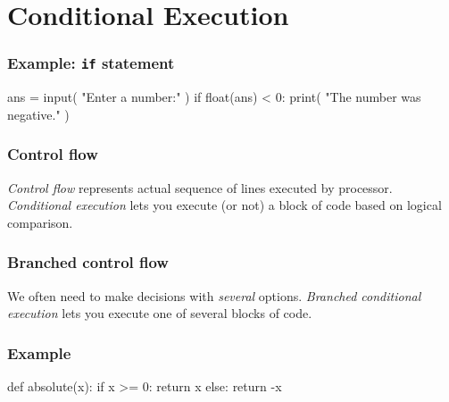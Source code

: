 \documentclass[11pt]{beamer}
\begin{document}
\section{Conditional Execution}

\begin{frame}[fragile]
  \frametitle{Example:  \texttt{if} statement}
  \Enlarge

  \begin{semiverbatim}
ans = input( "Enter a number:" )
if float(ans) < 0:
    print( "The number was negative." )
  \end{semiverbatim}
\end{frame}

\begin{frame}[fragile]
  \frametitle{Control flow}
  \Enlarge

  \begin{itemize}
  \myitem  \emph{Control flow} represents actual sequence of lines executed by processor. %
  \myitem  \emph{Conditional execution} lets you execute (or not) a block of code based on logical comparison.
  \end{itemize}
\end{frame}

\begin{frame}[fragile]
  \frametitle{Branched control flow}
  \Enlarge

  \begin{itemize}
  \myitem  We often need to make decisions with \emph{several} options. %
  \myitem  \emph{Branched conditional execution} lets you execute one of several blocks of code.
  \end{itemize}
\end{frame}

\begin{frame}[fragile]
  \frametitle{Example}
  \Enlarge

  \begin{semiverbatim}
def absolute(x):
    if x >= 0:
        return x
    else:
        return -x
  \end{semiverbatim}
\end{frame}
\end{document}
